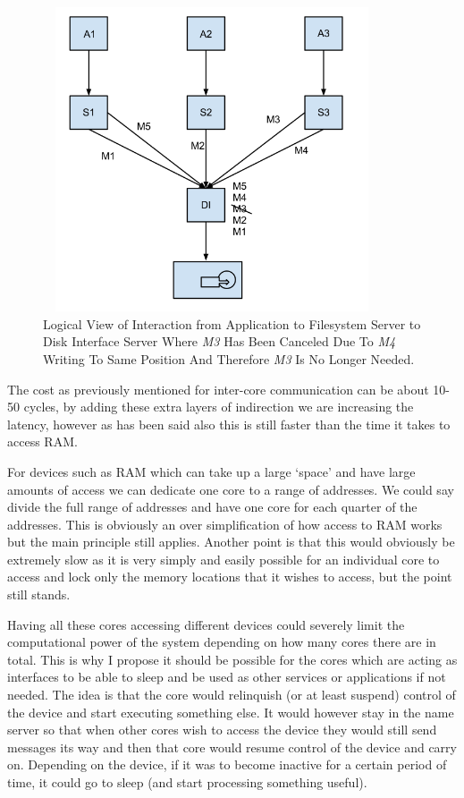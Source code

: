 \documentclass[journal]{IEEEtran}
\begin{document}
\begin{figure}
\includegraphics[height = 9cm, width=10cm]{MessagetoDisk.png}
\caption{Logical View of Interaction from Application to Filesystem Server to Disk Interface Server Where \emph{M3} Has Been Canceled Due To \emph{M4} Writing To Same Position And Therefore \emph{M3} Is No Longer Needed.}
\label{MessageToDisk}
\end{figure}

The cost as previously mentioned for inter-core communication can be about 10-50 cycles, by adding these extra layers of indirection we are increasing the latency, however as has been said also this is still faster than the time it takes to access RAM. 

For devices such as RAM which can take up a large `space' and have large amounts of access we can dedicate one core to a range of addresses. We could say divide the full range of addresses and have one core for each quarter of the addresses. This is obviously an over simplification of how access to RAM works but the main principle still applies. Another point is that this would obviously be extremely slow as it is very simply and easily possible for an individual core to access and lock only the memory locations that it wishes to access, but the point still stands.

Having all these cores accessing different devices could severely limit the computational power of the system depending on how many cores there are in total. This is why I propose it should be possible for the cores which are acting as interfaces to be able to sleep and be used as other services or applications if not needed. The idea is that the core would relinquish (or at least suspend) control of the device and start executing something else. It would however stay in the name server so that when other cores wish to access the device they would still send messages its way and then that core would resume control of the device and carry on. Depending on the device, if it was to become inactive for a certain period of time, it could go to sleep (and start processing something useful). 
\end{document}
